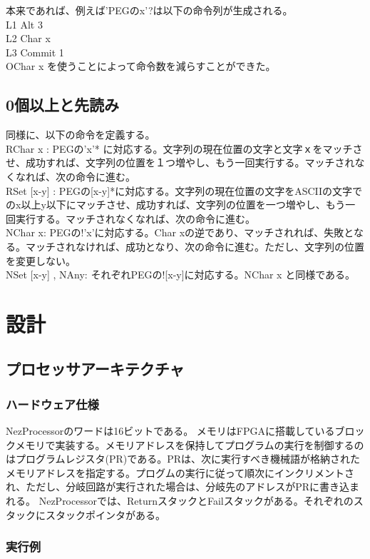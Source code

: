 \documentclass[paper]{ieicej}
\begin{document}
本来であれば、例えば'PEGのx'?は以下の命令列が生成される。\\
L1 Alt 3\\
L2 Char x\\
L3 Commit 1\\

OChar x を使うことによって命令数を減らすことができた。

\subsection{0個以上と先読み}
同様に、以下の命令を定義する。\\
RChar x : PEGの'x'* に対応する。文字列の現在位置の文字と文字ｘをマッチさせ、成功すれば、文字列の位置を１つ増やし、もう一回実行する。マッチされなくなれば、次の命令に進む。\\
RSet [x-y] : PEGの[x-y]*に対応する。文字列の現在位置の文字をASCIIの文字でのx以上y以下にマッチさせ、成功すれば、文字列の位置を一つ増やし、もう一回実行する。マッチされなくなれば、次の命令に進む。\\
NChar x: PEGの!'x'に対応する。Char xの逆であり、マッチされれば、失敗となる。マッチされなければ、成功となり、次の命令に進む。ただし、文字列の位置を変更しない。\\
NSet [x-y] , NAny: それぞれPEGの![x-y]に対応する。NChar x と同様である。\\


\section{設計}

\subsection{プロセッサアーキテクチャ}
\subsubsection{ハードウェア仕様}
NezProcessorのワードは16ビットである。
メモリはFPGAに搭載しているブロックメモリで実装する。メモリアドレスを保持してプログラムの実行を制御するのはプログラムレジスタ(PR)である。PRは、次に実行すべき機械語が格納されたメモリアドレスを指定する。プログムの実行に従って順次にインクリメントされ、ただし、分岐回路が実行された場合は、分岐先のアドレスがPRに書き込まれる。
NezProcessorでは、ReturnスタックとFailスタックがある。それぞれのスタックにスタックポインタがある。

\subsubsection{実行例}
\end{document}
